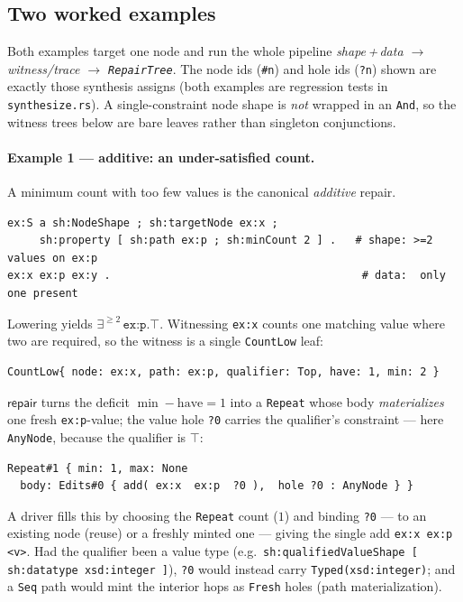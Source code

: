 \documentclass[11pt]{article}
\newcommand{\Repair}{\mathsf{repair}}
\newcommand{\code}[1]{\texttt{#1}}
\theoremstyle{definition}
\begin{document}
\subsection{Two worked examples}\label{sec:repair-examples}
Both examples target one node and run the whole pipeline
\emph{shape\,+\,data $\to$ witness/trace $\to$ \code{RepairTree}}. The node ids
(\code{\#n}) and hole ids (\code{?n}) shown are exactly those synthesis assigns
(both examples are regression tests in \code{synthesize.rs}). A single-constraint
node shape is \emph{not} wrapped in an \code{And}, so the witness trees below are
bare leaves rather than singleton conjunctions.

\paragraph{Example 1 --- additive: an under-satisfied count.} A minimum count with
too few values is the canonical \emph{additive} repair.
\begin{lstlisting}[language={}]
ex:S a sh:NodeShape ; sh:targetNode ex:x ;
     sh:property [ sh:path ex:p ; sh:minCount 2 ] .   # shape: >=2 values on ex:p
ex:x ex:p ex:y .                                       # data:  only one present
\end{lstlisting}
Lowering yields $\exists^{\geq 2}\,\code{ex:p}.\top$. Witnessing \code{ex:x} counts
one matching value where two are required, so the witness is a single
\code{CountLow} leaf:
\begin{lstlisting}[language={}]
CountLow{ node: ex:x, path: ex:p, qualifier: Top, have: 1, min: 2 }
\end{lstlisting}
$\Repair$ turns the deficit $\min-\mathrm{have}=1$ into a \code{Repeat} whose body
\emph{materializes} one fresh \code{ex:p}-value; the value hole \code{?0} carries
the qualifier's constraint --- here \code{AnyNode}, because the qualifier is $\top$:
\begin{lstlisting}[language={}]
Repeat#1 { min: 1, max: None
  body: Edits#0 { add( ex:x  ex:p  ?0 ),  hole ?0 : AnyNode } }
\end{lstlisting}
A driver fills this by choosing the \code{Repeat} count ($1$) and binding \code{?0}
--- to an existing node (reuse) or a freshly minted one --- giving the single add
\code{ex:x ex:p <v>}. Had the qualifier been a value type (e.g.\
\code{sh:qualifiedValueShape [ sh:datatype xsd:integer ]}), \code{?0} would instead
carry \code{Typed(xsd:integer)}; and a \code{Seq} path would mint the interior hops
as \code{Fresh} holes (path materialization).
\end{document}
